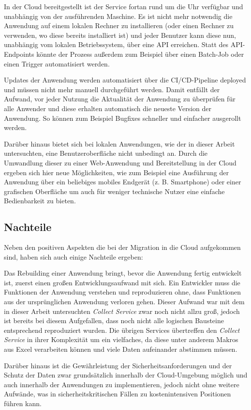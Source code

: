 In der Cloud bereitgestellt ist der Service fortan rund um die Uhr verfügbar und unabhängig von der ausführenden Maschine. Es ist nicht mehr notwendig die Anwendung auf einem lokalen Rechner zu installieren (oder einen Rechner zu verwenden, wo diese bereits installiert ist) und jeder Benutzer kann diese nun, unabhängig vom lokalen Betriebssystem, über eine \ac{API} erreichen. Statt des \ac{API}-Endpoints könnte der Prozess außerdem zum Beispiel über einen Batch-Job oder einen Trigger automatisiert werden.

Updates der Anwendung werden automatisiert über die \ac{CI/CD}-Pipeline deployed und müssen nicht mehr manuell durchgeführt werden. Damit entfällt der Aufwand, vor jeder Nutzung die Aktualität der Anwendung zu überprüfen für alle Anwender und diese erhalten automatisch die neueste Version der Anwendung. So können zum Beispiel Bugfixes schneller und einfacher ausgerollt werden. 

Darüber hinaus bietet sich bei lokalen Anwendungen, wie der in dieser Arbeit untersuchten, eine Benutzeroberfläche nicht unbedingt an. Durch die Umwandlung dieser zu einer Web-Anwendung und Bereitstellung in der Cloud ergeben sich hier neue Möglichkeiten, wie zum Beispiel eine Ausführung der Anwendung über ein beliebiges mobiles Endgerät (z. B. Smartphone) oder einer grafischen Oberfläche um auch für weniger technische Nutzer eine einfache Bedienbarkeit zu bieten. \pagebreak

\subsection{Nachteile}
Neben den positiven Aspekten die bei der Migration in die Cloud aufgekommen sind, haben sich auch einige Nachteile ergeben:

Das Rebuilding einer Anwendung bringt, bevor die Anwendung fertig entwickelt ist, zuerst einen großen Entwicklungsaufwand mit sich. Ein Entwickler muss die Funktionen der Anwendung verstehen und reproduzieren ohne, dass Funktionen aus der ursprünglichen Anwendung verloren gehen. Dieser Aufwand war mit dem in dieser Arbeit untersuchten \textit{Collect Service} zwar noch nicht allzu groß, jedoch ist bereits bei diesem Aufgefallen, dass noch nicht alle logischen Bausteine entsprechend reproduziert wurden. Die übrigen Services übertreffen den \textit{Collect Service} in ihrer Komplexität um ein vielfaches, da diese unter anderem Makros aus Excel verarbeiten können und viele Daten aufeinander abstimmen müssen.

Darüber hinaus ist die Gewährleistung der Sicherheitsanforderungen und der Schutz der Daten zwar grundsätzlich innerhalb der Cloud-Umgebung möglich und auch innerhalb der Anwendungen zu implementieren, jedoch nicht ohne weitere Aufwände, was in sicherheitskritischen Fällen zu kostenintensiven Positionen führen kann. 

